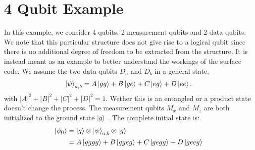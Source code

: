 \documentclass[9pt,a4paper,twocolumn,twoside]{tau-class/tau}
\begin{document}
\section*{4 Qubit Example}
In this example, we consider 4 qubits, 2 measurement qubits and 2 data qubits. We note that this particular structure does not give rise to a logical qubit since there is no additional degree of freedom to be extracted from the structure. It is instead meant as an example to better understand the workings of the surface code.
We assume the two data qubits $D_a$ and $D_b$ in a general state, 
\begin{equation}
    \ket{\psi}_{a,b}=A\ket{gg}+B\ket{ge}+C\ket{eg}+D\ket{ee}.
    \label{eq: general state 2 qubits}
\end{equation}
with \(|A|^2 + |B|^2+|C|^2+|D|^2 = 1\). Wether this is an entangled or a product state doesn't change the process. 
The measurement qubits $M_x$ and $M_z$ are both initialized to the ground state $\ket{g}$ \cite{fowler2012surface}. The complete initial state is: 
\begin{align}
    \ket{\psi_0} &= \ket{g} \otimes \ket{\psi}_{a,b} \otimes \ket{g}\notag \\
    &= A\ket{gggg}+B\ket{ggeg}+C\ket{gegg}+D\ket{geeg} 
    \label{eq: general state 4 qubits}
\end{align}
\end{document}
